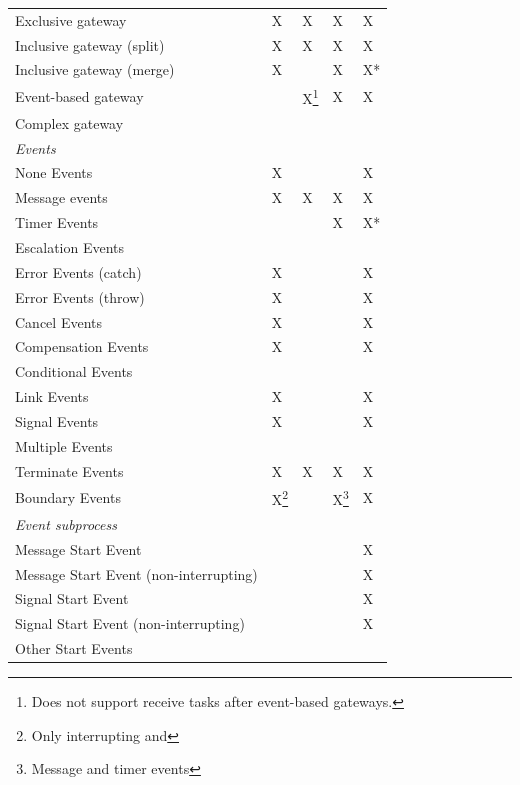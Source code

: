 \documentclass[adraft, copyright, creativecommons]{eptcs} %
\begin{document}
\begin{table}[htbp]
\begin{tabular}{l l l l l}
      Exclusive gateway & X & X & X & X\\
      Inclusive gateway (split) & X & X & X & X\\
      Inclusive gateway (merge) & X & & X & X*\\
      Event-based gateway &  & X\footnote{Does not support receive tasks after event-based gateways.} & X & X\\ %
      Complex gateway & & & &\\
      \textit{Events} & & & & \\
      None Events & X & & & X\\
      Message events & X & X & X & X\\
      Timer Events & & & X & X*\\
      Escalation Events & & & & \\
      Error Events (catch) & X & & & \color{yellow}X\\ %
      Error Events (throw) & X & & & \color{yellow}X\\
      Cancel Events & X & & & \color{yellow}X\\
      Compensation Events & X & & & \color{yellow}X\\
      Conditional Events & & & &\\
      Link Events & X & & & X\\
      Signal Events & X & & & X\\
      Multiple Events &  & & & \\
      Terminate Events & X & X & X & X\\
     Boundary Events & X\footnote{Only interrupting and } & & X\footnote{Message and timer events} & X\\ %
      \textit{Event subprocess} &  &  &  & \\
      Message Start Event &  & & & X\\
      Message Start Event (non-interrupting) & & & & X\\
      Signal Start Event &  & & & X\\
      Signal Start Event (non-interrupting) &  & & & X\\
      Other Start Events &  & & & \\ %
    \end{tabular}
\end{table}
\end{document}
